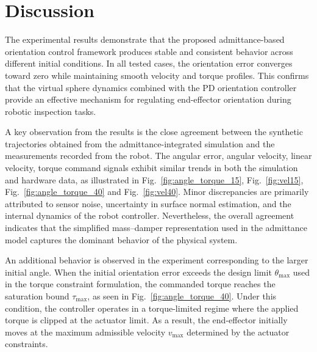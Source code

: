 \documentclass[journal]{IEEEtran}
\begin{document}
\section{Discussion}

The experimental results demonstrate that the proposed admittance-based orientation control framework produces stable and consistent behavior across different initial conditions. In all tested cases, the orientation error converges toward zero while maintaining smooth velocity and torque profiles. This confirms that the virtual sphere dynamics combined with the PD orientation controller provide an effective mechanism for regulating end-effector orientation during robotic inspection tasks.

A key observation from the results is the close agreement between the synthetic trajectories obtained from the admittance-integrated simulation and the measurements recorded from the robot. The angular error, angular velocity, linear velocity, torque command signals exhibit similar trends in both the simulation and hardware data, as illustrated in Fig.~\ref{fig:angle_torque_15}, Fig.~\ref{fig:vel15}, Fig.~\ref{fig:angle_torque_40} and Fig.~\ref{fig:vel40}. Minor discrepancies are primarily attributed to sensor noise, uncertainty in surface normal estimation, and the internal dynamics of the robot controller. Nevertheless, the overall agreement indicates that the simplified mass–damper representation used in the admittance model captures the dominant behavior of the physical system.

An additional behavior is observed in the experiment corresponding to the larger initial angle. When the initial orientation error exceeds the design limit $\theta_{\max}$ used in the torque constraint formulation, the commanded torque reaches the saturation bound $\tau_{\max}$, as seen in Fig.~\ref{fig:angle_torque_40}. Under this condition, the controller operates in a torque-limited regime where the applied torque is clipped at the actuator limit. As a result, the end-effector initially moves at the maximum admissible velocity $v_{\max}$ determined by the actuator constraints.
\end{document}
